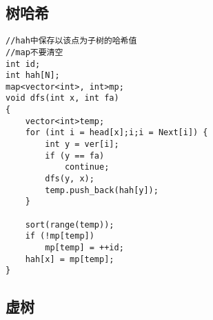 \documentclass[twocolumn,a4]{article}
\begin{document}
\subsection{树哈希}
\begin{lstlisting}
//hah中保存以该点为子树的哈希值
//map不要清空
int id;
int hah[N];
map<vector<int>, int>mp;
void dfs(int x, int fa)
{
    vector<int>temp;
    for (int i = head[x];i;i = Next[i]) {
        int y = ver[i];
        if (y == fa)
            continue;
        dfs(y, x);
        temp.push_back(hah[y]);
    }

    sort(range(temp));
    if (!mp[temp])
        mp[temp] = ++id;
    hah[x] = mp[temp];
}

\end{lstlisting}

\subsection{虚树}
\end{document}
